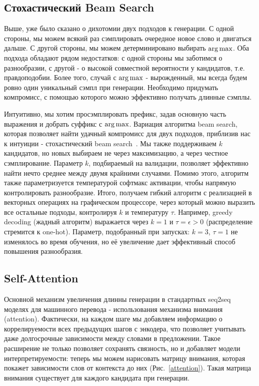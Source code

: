 \documentclass{spbau-diploma}
\begin{document}
\subsection{Стохастический Beam Search}
Выше, уже было сказано о дихотомии двух подходов к генерации. С одной стороны,
мы можем всякий раз сэмплировать очередное новое слово и двигаться дальше. С
другой стороны, мы можем детерминировано выбирать $\operatorname*{arg\,max}$. Оба подхода 
обладают рядом недостатков: с одной стороны мы заботимся о разнообразии, с 
другой - о высокой совместной вероятности у кандидатов, т.е. правдоподобии.
Более того, случай с $\operatorname*{arg\,max}$ - вырожденный, мы всегда будем ровно один
уникальный сэмпл при генерации. Необходимо придумать компромисс, с помощью 
которого можно эффективно получать длинные сэмплы.

Интуитивно, мы хотим просэмплировать префикс, задав основную часть выражения и 
добрать суффикс с $\operatorname*{arg\,max}$. Вариация алгоритма beam search, которая позволяет
найти удачный компромисс для двух подходов, приблизив нас к интуиции - 
стохастический beam search~\cite{sbeamsearch}. Мы также поддерживаем $k$ 
кандидатов, но новых выбираем не через максимизацию, а через честное 
сэмплирование. Параметр $k$, подбираемый на валидации, позволяет эффективно 
найти нечто среднее между двумя крайними случаями. Помимо этого, алгоритм 
также параметризуется температурой софтмакс активации, чтобы напрямую 
контролировать разнообразие. Итого, получаем гибкий алгоритм с реализацией в 
векторных операциях на графическом процессоре, через который можно выразить 
все остальные подходы, контролируя $k$ и температуру $\tau$. Например, greedy 
decoding (жадный алгоритм) выражается через $k=1$ и $\tau=\epsilon > 0$ 
(распределение стремится к one-hot). 
Параметр, подобранный при запусках: $k=3$, $\tau=1$ не изменялось 
во время обучения, но её увеличение дает эффективный способ повышения 
разнообразия.

\subsection{Self-Attention}
Основной механизм увеличения длинны генерации в стандартных seq2seq моделях
для машинного перевода - использования механизма внимания (attention). 
Фактически, на каждом шаге мы добавляем информацию о коррелируемости всех 
предыдущих шагов с энкодера, что позволяет учитывать даже долгосрочные
зависимости между словами в предложении. Такое расширение не только позволяет
сохранять связность, но и добавляет модели интерпретируемости: теперь мы можем
нарисовать матрицу внимания, которая покажет зависимости слов от контекста до 
них (Рис.~\ref{attention}). Такая матрица внимания существует для каждого 
кандидата при генерации.
\end{document}
